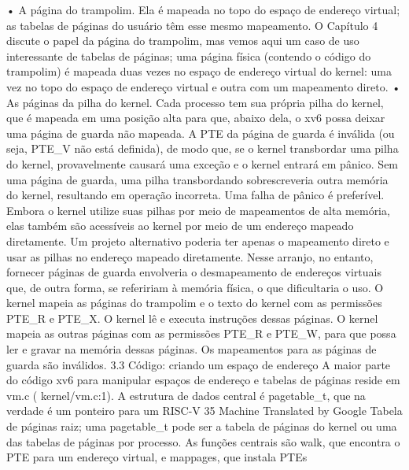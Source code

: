  •  A  página  do  trampolim.  Ela  é  mapeada  no  topo  do  espaço  de  endereço  virtual;  as  tabelas  de  páginas  do  usuário  
têm  esse  mesmo  mapeamento.  O  Capítulo  4  discute  o  papel  da  página  do  trampolim,  mas  vemos  aqui  um  caso  de  
uso  interessante  de  tabelas  de  páginas;  uma  página  física  (contendo  o  código  do  trampolim)  é  mapeada  duas  
vezes  no  espaço  de  endereço  virtual  do  kernel:  uma  vez  no  topo  do  espaço  de  endereço  virtual  e  outra  com  um  
mapeamento  direto.
 •  As  páginas  da  pilha  do  kernel.  Cada  processo  tem  sua  própria  pilha  do  kernel,  que  é  mapeada  em  uma  posição  alta  
para  que,  abaixo  dela,  o  xv6  possa  deixar  uma  página  de  guarda  não  mapeada.  A  PTE  da  página  de  guarda  é  
inválida  (ou  seja,  PTE_V  não  está  definida),  de  modo  que,  se  o  kernel  transbordar  uma  pilha  do  kernel,  
provavelmente  causará  uma  exceção  e  o  kernel  entrará  em  pânico.  Sem  uma  página  de  guarda,  uma  pilha  
transbordando  sobrescreveria  outra  memória  do  kernel,  resultando  em  operação  incorreta.  Uma  falha  de  pânico  é  preferível.
 Embora  o  kernel  utilize  suas  pilhas  por  meio  de  mapeamentos  de  alta  memória,  elas  também  são  acessíveis  ao  
kernel  por  meio  de  um  endereço  mapeado  diretamente.  Um  projeto  alternativo  poderia  ter  apenas  o  mapeamento  direto  
e  usar  as  pilhas  no  endereço  mapeado  diretamente.  Nesse  arranjo,  no  entanto,  fornecer  páginas  de  guarda  envolveria  o  
desmapeamento  de  endereços  virtuais  que,  de  outra  forma,  se  refeririam  à  memória  física,  o  que  dificultaria  o  uso.
 O  kernel  mapeia  as  páginas  do  trampolim  e  o  texto  do  kernel  com  as  permissões  PTE_R  e  PTE_X.  O  kernel  lê  e  
executa  instruções  dessas  páginas.  O  kernel  mapeia  as  outras  páginas  com  as  permissões  PTE_R  e  PTE_W,  para  que  
possa  ler  e  gravar  na  memória  dessas  páginas.  Os  mapeamentos  para  as  páginas  de  guarda  são  inválidos.
 3.3  Código:  criando  um  espaço  de  endereço
 A  maior  parte  do  código  xv6  para  manipular  espaços  de  endereço  e  tabelas  de  páginas  reside  em  vm.c  ( kernel/vm.c:1).  
A  estrutura  de  dados  central  é  pagetable_t,  que  na  verdade  é  um  ponteiro  para  um  RISC-V
 35
Machine Translated by Google
 Tabela  de  páginas  raiz;  uma  pagetable_t  pode  ser  a  tabela  de  páginas  do  kernel  ou  uma  das  tabelas  de  páginas  por  
processo.  As  funções  centrais  são  walk,  que  encontra  o  PTE  para  um  endereço  virtual,  e  mappages,  que  instala  PTEs  

